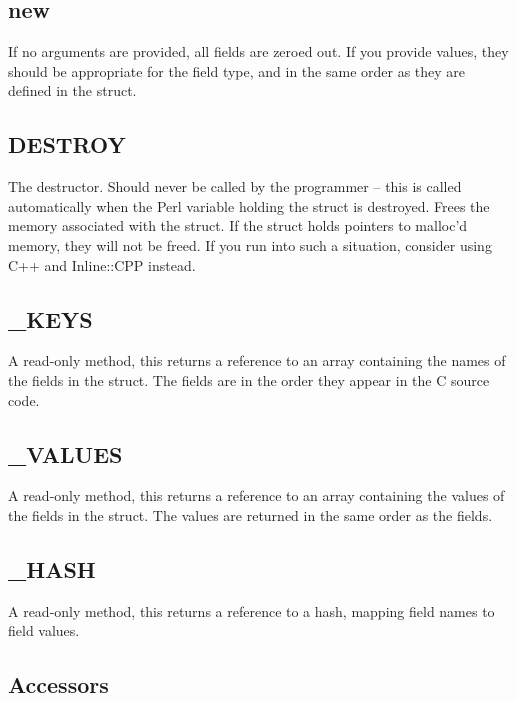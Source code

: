 \documentclass{article}
\begin{document}
\subsection{new\label{new}}


If no arguments are provided, all fields are zeroed out. If you provide values,
they should be appropriate for the field type, and in the same order as they
are defined in the struct.

\subsection{DESTROY\label{DESTROY}}


The destructor. Should never be called by the programmer -- this is called 
automatically when the Perl variable holding the struct is destroyed. Frees
the memory associated with the struct. If the struct holds pointers to malloc'd
memory, they will not be freed. If you run into such a situation, consider 
using C++ and Inline::CPP instead.

\subsection{\_KEYS\label{_KEYS}}


A read-only method, this returns a reference to an array containing the names
of the fields in the struct. The fields are in the order they appear in the 
C source code.

\subsection{\_VALUES\label{_VALUES}}


A read-only method, this returns a reference to an array containing the values
of the fields in the struct. The values are returned in the same order as the
fields.

\subsection{\_HASH\label{_HASH}}


A read-only method, this returns a reference to a hash, mapping field names
to field values.

\subsection{Accessors\label{Accessors}}
\end{document}
